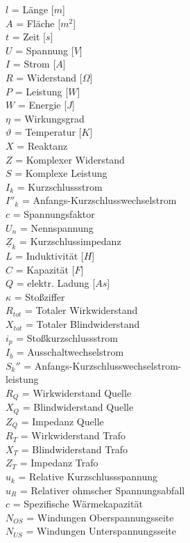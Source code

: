 \documentclass[11pt, a4paper, final, fleqn, twocolumn]{article}
\numberwithin{equation}{subsection}
\begin{document}
    \noindent
    $l$ = Länge [$m$] \\
    $A$ = Fläche [$m^2$] \\
    $t$ = Zeit [$s$] \\
    $U$ = Spannung [$V$] \\
    $I$ = Strom [$A$] \\
    $R$ = Widerstand [$\Omega$] \\
    $P$ = Leistung [$W$] \\
    $W$ = Energie [$J$] \\
    $\eta$ = Wirkungsgrad \\
    $\vartheta$ = Temperatur [$K$]\\
    $X$ = Reaktanz \\
    $Z$ = Komplexer Widerstand \\
    $S$ = Komplexe Leistung \\
    $I_k$ = Kurzschlussstrom \\
    $I''_k$ = Anfangs-Kurzschlusswechselstrom \\
    $c$ = Spannungsfaktor \\
    $U_n$ = Nennspannung \\
    $\underline{Z}_k$ = Kurzschlussimpedanz \\
    $L$ = Induktivität [$H$] \\
    $C$ = Kapazität [$F$] \\
    $Q$ = elektr. Ladung [$As$] \\
    $\kappa$ = Stoßziffer \\
    $R_{tot}$ = Totaler Wirkwiderstand \\
    $X_{tot}$ = Totaler Blindwiderstand \\
    $i_p$ = Stoßkurzschlussstrom \\
    $I_b$ = Ausschaltwechselstrom \\
    $S_k''$ = Anfangs-Kurzschlusswechselstrom- \\
    \indent \hspace{1.3em} leistung \\
    $R_Q$ = Wirkwiderstand Quelle \\
    $X_Q$ = Blindwiderstand Quelle \\
    $Z_Q$ = Impedanz Quelle \\
    $R_T$ = Wirkwiderstand Trafo \\
    $X_T$ = Blindwiderstand Trafo \\
    $Z_T$ = Impedanz Trafo \\
    $u_k$ = Relative Kurzschlussspannung \\
    $u_R$ = Relativer ohmscher Spannungsabfall \\
    $c$ = Spezifische Wärmekapazität \\
    $N_{OS}$ = Windungen Oberspannungsseite \\
    $N_{US}$ = Windungen Unterspannungsseite
    
\end{document}
